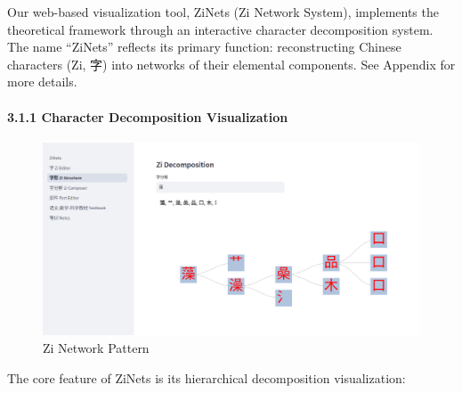 \documentclass[
  11pt,
  letterpaper,
]{article}
\begin{document}
Our web-based visualization tool, ZiNets (Zi Network System), implements
the theoretical framework through an interactive character decomposition
system. The name ``ZiNets'' reflects its primary function:
reconstructing Chinese characters (Zi, 字) into networks of their
elemental components. See Appendix for more details.

\paragraph{3.1.1 Character Decomposition
Visualization}\label{character-decomposition-visualization}

\begin{figure}
\centering
\includegraphics{./images/app_decomposing-zi-2.png}
\caption{Zi Network Pattern}
\end{figure}

The core feature of ZiNets is its hierarchical decomposition
visualization:
\end{document}
